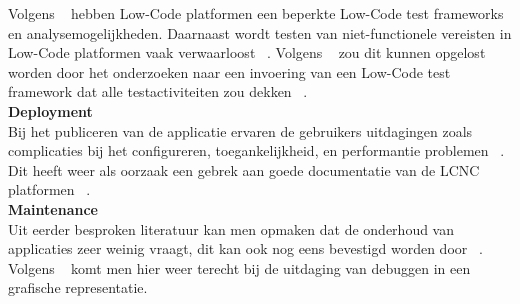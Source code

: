 Volgens ~\textcite{Rokis_2022} hebben Low-Code platformen een beperkte Low-Code test frameworks en analysemogelijkheden. 
Daarnaast wordt testen van niet-functionele vereisten in Low-Code platformen vaak verwaarloost ~\autocite{Rokis_2022}. 
Volgens ~\textcite{Rokis_2022} zou dit kunnen opgelost worden door het onderzoeken naar een invoering van een Low-Code test framework dat alle testactiviteiten zou dekken ~\autocite{Rokis_2022}.
\\
\textbf{Deployment}
\\
Bij het publiceren van de applicatie ervaren de gebruikers uitdagingen zoals complicaties bij het configureren, toegankelijkheid, en performantie problemen ~\autocite{Rokis_2022}. 
Dit heeft weer als oorzaak een gebrek aan goede documentatie van de LCNC platformen ~\autocite{Rokis_2022}.
\\
\textbf{Maintenance}
\\
Uit eerder besproken literatuur kan men opmaken dat de onderhoud van applicaties zeer weinig vraagt, dit kan ook nog eens bevestigd worden door ~\textcite{Rokis_2022}.
Volgens ~\textcite{Rokis_2022} komt men hier weer terecht bij de uitdaging van debuggen in een grafische representatie.


